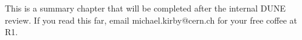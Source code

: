 \documentclass[../main-v1.tex]{subfiles}
\begin{document}
This is a summary chapter that will be completed after the internal DUNE review. If you read this far, email michael.kirby@cern.ch for your free coffee at R1.



\end{document}
